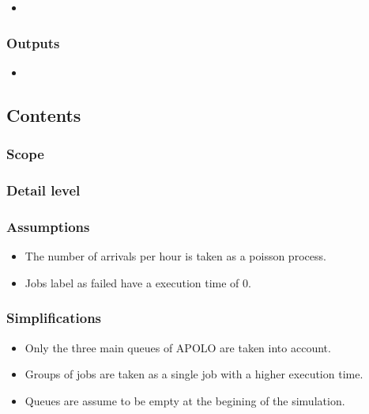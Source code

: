 \documentclass{wscpaperproc}
\begin{document}
\begin{itemize}
    \item
\end{itemize}

\subsubsection{Outputs}

\begin{itemize}
    \item
\end{itemize}

\subsection{Contents}

\subsubsection{Scope}



\subsubsection{Detail level}



\subsubsection{Assumptions}

\begin{itemize}
    \item The number of arrivals per hour is taken as a poisson process.
    \item Jobs label as failed have a execution time of 0.
\end{itemize}

\subsubsection{Simplifications}

\begin{itemize}
    \item Only the three main queues of APOLO are taken into account.
    \item Groups of jobs are taken as a single job with a higher execution time.
    \item Queues are assume to be empty at the begining of the simulation.
\end{itemize}
\end{document}
